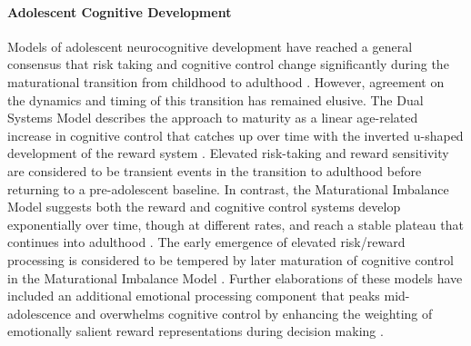 \documentclass[utf8]{stylesheet}
\begin{document}
\paragraph*{Adolescent Cognitive Development} Models of adolescent neurocognitive development have reached a general consensus that risk taking and cognitive control change significantly during the maturational transition from childhood to adulthood \citep{Steinberg2010}. However, agreement on the dynamics and timing of this transition has remained elusive. The Dual Systems Model describes the approach to maturity as a linear age-related increase in cognitive control that catches up over time with the inverted u-shaped development of the reward system \citep{Steinberg2005}. Elevated risk-taking and reward sensitivity are considered to be transient events in the transition to adulthood before returning to a pre-adolescent baseline. In contrast, the Maturational Imbalance Model suggests both the reward and cognitive control systems develop exponentially over time, though at different rates, and reach a stable plateau that continues into adulthood \citep{CaseyEtAl2008}. The early emergence of elevated risk/reward processing is considered to be tempered by later maturation of cognitive control in the Maturational Imbalance Model \citep{somerville2010developmental}. Further elaborations of these models have included an additional emotional processing component that peaks mid-adolescence and overwhelms cognitive control by enhancing the weighting of emotionally salient reward representations during decision making \citep{casey2019development}.
\vspace{4pt}
\end{document}
